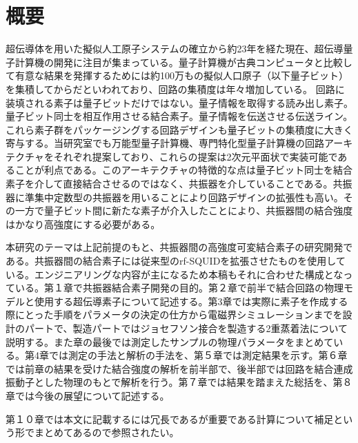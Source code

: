 \section*{概要}
超伝導体を用いた擬似人工原子システムの確立\cite*{nakamura1999coherent}から約23年を経た現在、超伝導量子計算機の開発に注目が集まっている。量子計算機が古典コンピュータと比較して有意な結果を発揮するためには約100万もの擬似人口原子（以下量子ビット）を集積してからだといわれており、回路の集積度は年々増加している。
回路に装填される素子は量子ビットだけではない。量子情報を取得する読み出し素子。量子ビット同士を相互作用させる結合素子。量子情報を伝送させる伝送ライン。これら素子群をパッケージングする回路デザインも量子ビットの集積度に大きく寄与する。当研究室でも万能型量子計算機、専門特化型量子計算機の回路アーキテクチャ\cite*{Mukai2019}をそれぞれ提案しており、これらの提案は2次元平面状で実装可能であることが利点である。このアーキテクチャの特徴的な点は量子ビット同士を結合素子を介して直接結合させるのではなく、共振器を介していることである。共振器に準集中定数型の共振器を用いることにより回路デザインの拡張性も高い。その一方で量子ビット間に新たな素子が介入したことにより、共振器間の結合強度はかなり高強度にする必要がある。

本研究のテーマは上記前提のもと、共振器間の高強度可変結合素子の研究開発である。共振器間の結合素子には従来型のrf-SQUIDを拡張させたものを使用している。エンジニアリングな内容が主になるため本稿もそれに合わせた構成となっている。第１章で共振器結合素子開発の目的。第２章で前半で結合回路の物理モデルと使用する超伝導素子について記述する。第3章では実際に素子を作成する際にとった手順をパラメータの決定の仕方から電磁界シミュレーションまでを設計のパートで、製造パートではジョセフソン接合を製造する2重蒸着法について説明する。また章の最後では測定したサンプルの物理パラメータをまとめている。第4章では測定の手法と解析の手法を、第５章では測定結果を示す。第６章では前章の結果を受けた結合強度の解析を前半部で、後半部では回路を結合連成振動子とした物理のもとで解析を行う。第７章では結果を踏まえた総括を、第８章では今後の展望について記述する。

第１０章では本文に記載するには冗長であるが重要である計算について補足という形でまとめてあるので参照されたい。
